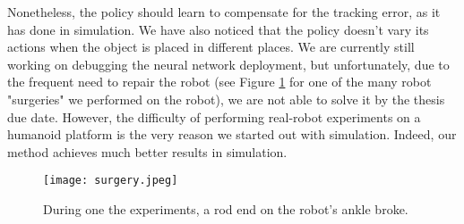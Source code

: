 Nonetheless, the policy should learn to compensate for the tracking error, as it has done in simulation. We have also noticed that the policy doesn't vary its actions when the object is placed in different places. We are currently still working on debugging the neural network deployment, but unfortunately, due to the frequent need to repair the robot (see Figure \ref{fig:surgery} for one of the many robot "surgeries" we performed on the robot), we are not able to solve it by the thesis due date. However, the difficulty of performing real-robot experiments on a humanoid platform is the very reason we started out with simulation. Indeed, our method achieves much better results in simulation.

\begin{figure}
	\centering
	\texttt{[image: surgery.jpeg]}
	\caption{During one the experiments, a rod end on the robot's ankle broke. }
    \label{fig:surgery}
\end{figure}
